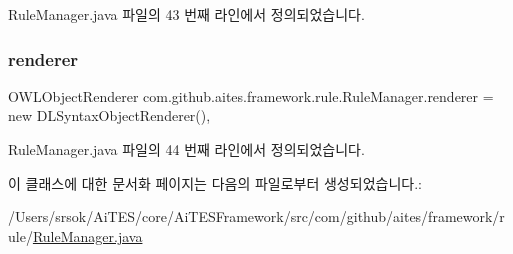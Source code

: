 Rule\+Manager.\+java 파일의 43 번째 라인에서 정의되었습니다.

\mbox{\label{classcom_1_1github_1_1aites_1_1framework_1_1rule_1_1_rule_manager_ae2bee87a9984ec9463cc7eaa5cc9952f}} 
\subsubsection{\texorpdfstring{renderer}{renderer}}
{\footnotesize\ttfamily O\+W\+L\+Object\+Renderer com.\+github.\+aites.\+framework.\+rule.\+Rule\+Manager.\+renderer = new D\+L\+Syntax\+Object\+Renderer()\hspace{0.3cm}{\ttfamily [static]}, {\ttfamily [private]}}



Rule\+Manager.\+java 파일의 44 번째 라인에서 정의되었습니다.



이 클래스에 대한 문서화 페이지는 다음의 파일로부터 생성되었습니다.\+:\begin{DoxyCompactItemize}
\item 
/\+Users/srsok/\+Ai\+T\+E\+S/core/\+Ai\+T\+E\+S\+Framework/src/com/github/aites/framework/rule/\mbox{\hyperlink{_rule_manager_8java}{Rule\+Manager.\+java}}\end{DoxyCompactItemize}
